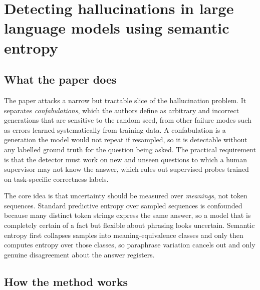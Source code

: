 \section{Detecting hallucinations in large language models using semantic entropy}

\subsection{What the paper does}

The paper attacks a narrow but tractable slice of the hallucination problem. It separates \emph{confabulations}, which the authors define as arbitrary and incorrect generations that are sensitive to the random seed, from other failure modes such as errors learned systematically from training data. A confabulation is a generation the model would not repeat if resampled, so it is detectable without any labelled ground truth for the question being asked. The practical requirement is that the detector must work on new and unseen questions to which a human supervisor may not know the answer, which rules out supervised probes trained on task-specific correctness labels.

The core idea is that uncertainty should be measured over \emph{meanings}, not token sequences. Standard predictive entropy over sampled sequences is confounded because many distinct token strings express the same answer, so a model that is completely certain of a fact but flexible about phrasing looks uncertain. Semantic entropy first collapses samples into meaning-equivalence classes and only then computes entropy over those classes, so paraphrase variation cancels out and only genuine disagreement about the answer registers.

\subsection{How the method works}

